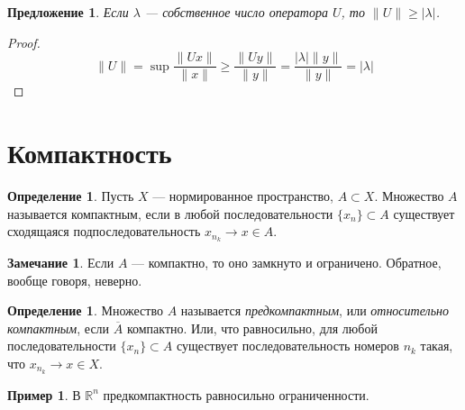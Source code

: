 \documentclass[11pt,openany,a4paper]{scrartcl}
\theoremstyle{plain}
\newtheorem{proposition}[theorem]{Предложение}
\theoremstyle{definition}
\newtheorem{definition}[theorem]{Определение}
\newtheorem{remark}[theorem]{Замечание}
\newtheorem{example}[theorem]{Пример}
\newcommand\mb{\mathbb}
\newcommand\real{\mb R}
\newcommand\ol{\overline}
\begin{document}
\begin{proposition}
    Если $\lambda$ — собственное число оператора $U$, то
    $\|U\| \geqslant |\lambda|$.
\end{proposition}
\begin{proof}
    $$
    \|U\| = \sup \frac{\|Ux\|}{\|x\|} \geqslant \frac{\|Uy\|}{\|y\|} =
    \frac{|\lambda|\|y\|}{\|y\|} = |\lambda|
    $$
\end{proof}

\section{Компактность}

\begin{definition}
    Пусть $X$ — нормированное пространство, $A\subset X$. Множество $A$ называется 
    компактным, если в любой последовательности $\{x_n\} \subset A$ существует сходящаяся
    подпоследовательность $x_{n_k} \to x \in A$.
\end{definition}
\begin{remark}
    Если $A$ — компактно, то оно замкнуто и ограничено. Обратное, вообще говоря, неверно.
\end{remark}
\begin{definition}
    Множество $A$ называется \emph{предкомпактным}, или \emph{относительно компактным}, если
    $\ol A$ компактно. Или, что равносильно, для любой последовательности $\{x_n\} \subset A$
    существует последовательность номеров $n_k$ такая, что $x_{n_k} \to x \in X$.
\end{definition}

\begin{example}
    В $\real^n$ предкомпактность равносильно ограниченности.
\end{example}
\end{document}
